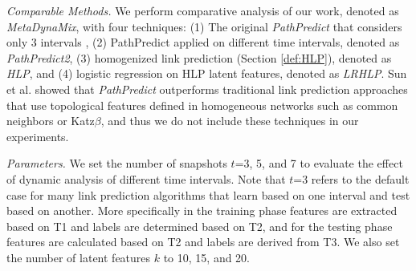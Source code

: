 





\textit{Comparable Methods.} We perform comparative analysis of our work, denoted as \textit{MetaDynaMix}, with four techniques: (1) The original \textit{PathPredict} that considers only 3 intervals \cite{sun2011ASONAM}, (2) PathPredict applied on different time intervals, denoted as \textit{PathPredict2}, (3) homogenized link prediction (Section \ref{def:HLP}), denoted as \textit{HLP}, and (4) logistic regression on HLP latent features, denoted as \textit{LRHLP}. %
Sun et al. \cite{sun2011ASONAM} showed that \textit{PathPredict} outperforms traditional link prediction approaches that use topological features defined in homogeneous networks such as common neighbors or Katz$\beta$, and thus we do not include these techniques in our experiments.




\textit{Parameters.} We set the number of snapshots $t$=3, 5, and 7 to evaluate the effect of dynamic analysis of different time intervals. Note that $t$=3 refers to the default case for many link prediction algorithms that learn based on one interval and test based on another. More specifically in the training phase features are extracted based on T1 and labels are determined based on T2, and for the testing phase features are calculated based on T2 and labels are derived from T3. We also set the number of latent features $k$ to 10, 15, and 20.


